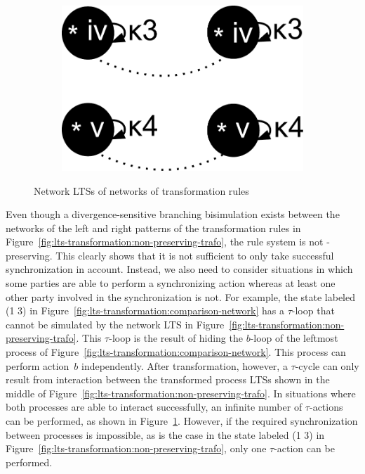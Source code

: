 \begin{figure}[hbt]
\begin{subfigure}[b]{106pt}
    \caption{}
    \label{fig:lts-transformation:subsets-ltss:middle}
  \end{subfigure}
  \hfill
  \begin{subfigure}[b]{102pt}
    \centering
    \includegraphics[scale=0.2]{lts-transformation/figs/subsets-ltss-right}
    \caption{}
    \label{fig:lts-transformation:subsets-ltss:right}
  \end{subfigure}
  \hfill
  \caption{Network LTSs of networks of transformation rules}
\end{figure}

Even though a divergence-sensitive branching bisimulation exists between the networks of the left and right patterns of the transformation rules in Figure~\ref{fig:lts-transformation:non-preserving-trafo}, the rule system is not \Sf-preserving.
This clearly shows that it is not sufficient to only take successful synchronization in account.
Instead, we also need to consider situations in which some parties are able to perform a synchronizing action whereas at least one other party involved in the synchronization is not.
For example, the state labeled (1 3) in Figure~\ref{fig:lts-transformation:comparison-network} has a $\tau$-loop that cannot be simulated by the network LTS in Figure~\ref{fig:lts-transformation:non-preserving-trafo}.
This $\tau$-loop is the result of hiding the $b$-loop of the leftmost process of Figure~\ref{fig:lts-transformation:comparison-network}.
This process can perform action~$b$ independently.
After transformation, however, a $\tau$-cycle can only result from interaction between the transformed process LTSs shown in the middle of Figure~\ref{fig:lts-transformation:non-preserving-trafo}.
In situations where both processes are able to interact successfully, an infinite number of $\tau$-actions can be performed, as shown in Figure~\ref{fig:lts-transformation:subsets-ltss:middle}.
However, if the required synchronization between processes is impossible, as is the case in the state labeled (1 3) in Figure~\ref{fig:lts-transformation:non-preserving-trafo}, only one $\tau$-action can be performed.

